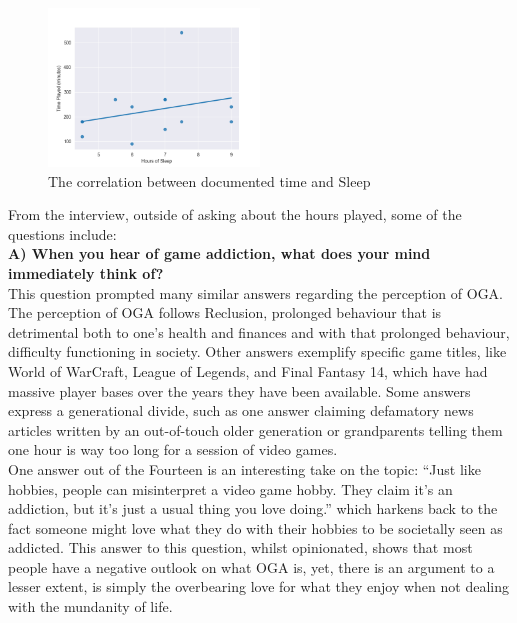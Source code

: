 \documentclass[conference]{IEEEtran}
\begin{document}
\begin{figure}[H]
\includegraphics[width = 0.5\textwidth]{Graph3}
\caption{The correlation between documented time and Sleep}
\label{figure8}
\end{figure}


From the interview, outside of asking about the hours played, some of the questions include:\\

 \textbf{A) When you hear of game addiction, what does your mind immediately think of?}\\

This question prompted many similar answers regarding the perception of OGA. The perception of OGA follows Reclusion, prolonged behaviour that is detrimental both to one’s health and finances and with that prolonged behaviour, difficulty functioning in society. Other answers exemplify specific game titles, like World of WarCraft\cite{Entertainment2004}, League of Legends\cite{Games2009}, and Final Fantasy 14\cite{Enix2013 }, which have had massive player bases over the years they have been available. Some answers express a generational divide, such as one answer claiming defamatory news articles written by an out-of-touch older generation or grandparents telling them one hour is way too long for a session of video games.\\

One answer out of the Fourteen is an interesting take on the topic: “Just like hobbies, people can misinterpret a video game hobby. They claim it’s an addiction, but it’s just a usual thing you love doing.” which harkens back to the fact someone might love what they do with their hobbies to be societally seen as addicted. This answer to this question, whilst opinionated, shows that most people have a negative outlook on what OGA is, yet, there is an argument to a lesser extent, is simply the overbearing love for what they enjoy when not dealing with the mundanity of life.\\
\end{document}
